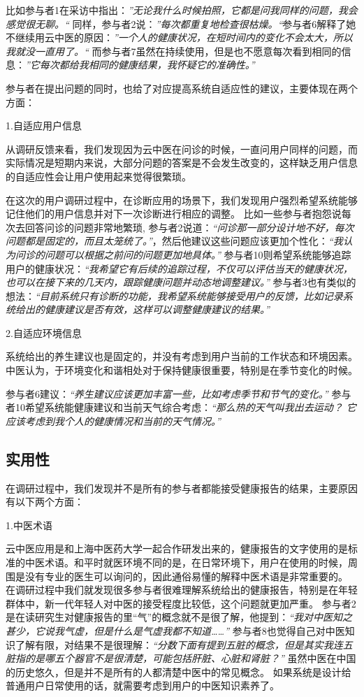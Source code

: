比如参与者1在采访中指出：\textit{”无论我什么时候拍照，它都是问我同样的问题，我会感觉很无聊。“}
同样，参与者2说：\textit{”每次都重复地检查很枯燥。“}参与者6解释了她不继续用云中医的原因：\textit{”一个人的健康状况，在短时间内的变化不会太大，所以我就没一直用了。“}
而参与者7虽然在持续使用，但是也不愿意每次看到相同的信息：\textit{”它每次都给我相同的健康结果，我怀疑它的准确性。”}

参与者在提出问题的同时，也给了对应提高系统自适应性的建议，主要体现在两个方面：

1.自适应用户信息

从调研反馈来看，我们发现因为云中医在问诊的时候，一直问用户同样的问题，而实际情况是短期内来说，大部分问题的答案是不会发生改变的，这样缺乏用户信息的自适应性会让用户使用起来觉得很繁琐。

在这次的用户调研过程中，在诊断应用的场景下，我们发现用户强烈希望系统能够记住他们的用户信息并对下一次诊断进行相应的调整。
比如一些参与者抱怨说每次去回答问诊的问题非常地繁琐, 参与者2说道：\textit{“问诊那一部分设计地不好，每次问题都是固定的，而且太笼统了。”}，然后他建议这些问题应该更加个性化：\textit{“我认为问诊的问题可以根据之前问的问题更加地具体。”}
参与者10则希望系统能够追踪用户的健康状况：\textit{“我希望它有后续的追踪过程，不仅可以评估当天的健康状况，也可以在接下来的几天内，跟踪健康问题并动态地调整建议。”}
参与者3也有类似的想法：\textit{“目前系统只有诊断的功能，我希望系统能够接受用户的反馈，比如记录系统给出的健康建议是否有效，这样可以调整健康建议的结果。”}

2.自适应环境信息

系统给出的养生建议也是固定的，并没有考虑到用户当前的工作状态和环境因素。中医认为，于环境变化和谐相处对于保持健康很重要，特别是在季节变化的时候。

参与者6建议：\textit{“养生建议应该更加丰富一些，比如考虑季节和节气的变化。”} 
参与者10希望系统能健康建议和当前天气综合考虑：\textit{“那么热的天气叫我出去运动？ 它应该考虑到我个人的健康情况和当前的天气情况。”}

\subsection{实用性}
在调研过程中，我们发现并不是所有的参与者都能接受健康报告的结果，主要原因有以下两个方面：

1.中医术语

云中医应用是和上海中医药大学一起合作研发出来的，健康报告的文字使用的是标准的中医术语。和平时就医环境不同的是，在日常环境下，用户在使用的时候，周围是没有专业的医生可以询问的，因此通俗易懂的解释中医术语是非常重要的。
在调研过程中我们就发现很多参与者很难理解系统给出的健康报告，特别是在年轻群体中，新一代年轻人对中医的接受程度比较低，这个问题就更加严重。
参与者2是在读研究生对健康报告的里“气”的概念就不是很了解，他提到：\textit{“我对中医知之甚少，它说我气虚，但是什么是气虚我都不知道……”}
参与者8也觉得自己对中医知识了解有限，对结果不是很理解：\textit{“分数下面有提到五脏的概念，但是其实我连五脏指的是哪五个器官不是很清楚，可能包括肝脏、心脏和肾脏？”}
虽然中医在中国的历史悠久，但是并不是所有的人都清楚中医中的常见概念。 如果系统是设计给普通用户日常使用的话，就需要考虑到用户的中医知识素养了。

